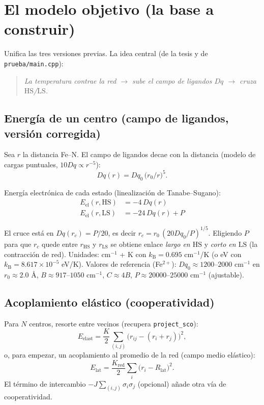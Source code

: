 \documentclass[11pt,a4paper]{article}
\newcommand{\HS}{\mathrm{HS}}
\newcommand{\LS}{\mathrm{LS}}
\newcommand{\Dq}{Dq}
\newcommand{\kb}{k_{\mathrm{B}}}
\begin{document}
\section{El modelo objetivo (la base a construir)}

Unifica las tres versiones previas. La idea central (de la tesis y de
\texttt{prueba/main.cpp}):

\begin{quote}
\emph{La temperatura contrae la red $\to$ sube el campo de ligandos $\Dq$ $\to$
cruza $\HS$/$\LS$.}
\end{quote}

\subsection{Energía de un centro (campo de ligandos, versión corregida)}

Sea $r$ la distancia Fe--N. El campo de ligandos decae con la distancia (modelo
de cargas puntuales, $10\Dq\propto r^{-5}$):
\begin{equation}
\Dq(r) = \Dq_0\,\bigl(r_0/r\bigr)^5 .
\end{equation}

Energía electrónica de cada estado (linealización de Tanabe--Sugano):
\begin{align}
E_{\mathrm{el}}(r,\HS) &= -4\,\Dq(r)\\
E_{\mathrm{el}}(r,\LS) &= -24\,\Dq(r) + P
\end{align}

El cruce está en $\Dq(r_c)=P/20$, es decir $r_c = r_0\,(20\Dq_0/P)^{1/5}$.
Eligiendo $P$ para que $r_c$ quede entre $r_{\HS}$ y $r_{\LS}$ se obtiene enlace
\emph{largo en $\HS$} y \emph{corto en $\LS$} (la contracción de red). Unidades:
cm$^{-1}$ + K con $\kb=0.695$ cm$^{-1}$/K (o eV con $\kb=8.617\times10^{-5}$ eV/K).
Valores de referencia (Fe$^{2+}$): $\Dq_0\approx 1200$--$2000$ cm$^{-1}$ en
$r_0\approx 2.0$ Å, $B\approx 917$--$1050$ cm$^{-1}$, $C\approx 4B$,
$P\approx 20000$--$25000$ cm$^{-1}$ (ajustable).

\subsection{Acoplamiento elástico (cooperatividad)}

Para $N$ centros, resorte entre vecinos (recupera \texttt{project\_sco}):
\begin{equation}
E_{\mathrm{elast}} = \frac{K}{2}\sum_{(i,j)}\bigl(r_{ij}-(r_i+r_j)\bigr)^2 ,
\end{equation}
o, para empezar, un acoplamiento al promedio de la red (campo medio elástico):
\begin{equation}
E_{\mathrm{lat}} = \frac{K_{\mathrm{red}}}{2}\sum_i\bigl(r_i - R_{\mathrm{lat}}\bigr)^2 .
\end{equation}
El término de intercambio $-J\sum_{(i,j)}\sigma_i\sigma_j$ (opcional) añade otra
vía de cooperatividad.
\end{document}
